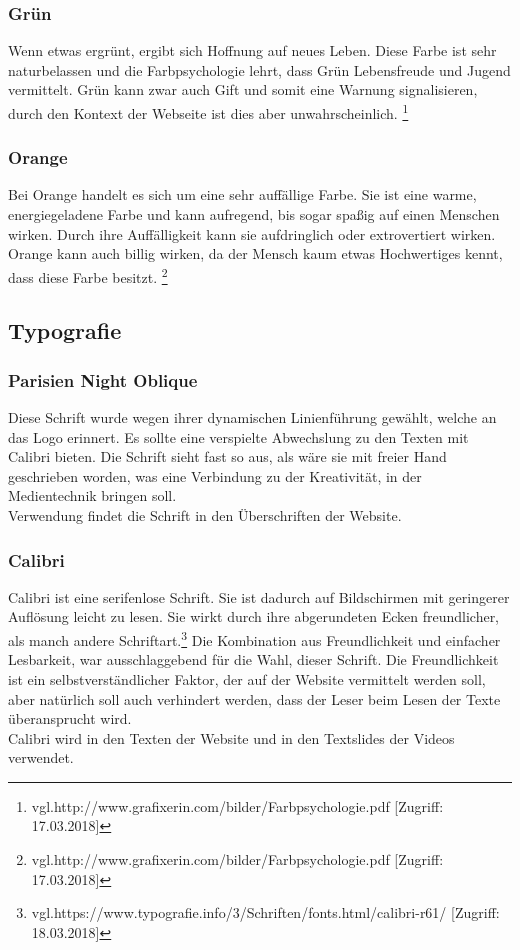 \subsubsection{Grün}
Wenn etwas ergrünt, ergibt sich Hoffnung auf neues Leben. Diese Farbe ist sehr naturbelassen und die Farbpsychologie lehrt, dass Grün Lebensfreude und Jugend vermittelt. Grün kann zwar auch Gift und somit eine Warnung signalisieren, durch den Kontext der Webseite ist dies aber unwahrscheinlich. \footnote{\label{} vgl.http://www.grafixerin.com/bilder/Farbpsychologie.pdf [Zugriff: 17.03.2018]}

\subsubsection{Orange}
Bei Orange handelt es sich um eine sehr auffällige Farbe. Sie ist eine warme, energiegeladene Farbe und kann aufregend, bis sogar spaßig auf einen Menschen wirken. Durch ihre Auffälligkeit kann sie aufdringlich oder extrovertiert wirken. Orange kann auch billig wirken, da der Mensch kaum etwas Hochwertiges kennt, dass diese Farbe besitzt. \footnote{\label{} vgl.http://www.grafixerin.com/bilder/Farbpsychologie.pdf [Zugriff: 17.03.2018]}

\subsection{Typografie}
\subsubsection{Parisien Night Oblique}
Diese Schrift wurde wegen ihrer dynamischen Linienführung gewählt, welche an das Logo erinnert. Es sollte eine verspielte Abwechslung zu den Texten mit Calibri bieten. Die Schrift sieht fast so aus, als wäre sie mit freier Hand geschrieben worden, was eine Verbindung zu der Kreativität, in der Medientechnik bringen soll.
\\
Verwendung findet die Schrift in den Überschriften der Website.

\subsubsection{Calibri}
Calibri ist eine serifenlose Schrift. Sie ist dadurch auf Bildschirmen mit geringerer Auflösung leicht zu lesen. Sie wirkt durch ihre abgerundeten Ecken freundlicher, als manch andere Schriftart.\footnote{\label{} vgl.https://www.typografie.info/3/Schriften/fonts.html/calibri-r61/ [Zugriff: 18.03.2018]} Die Kombination aus Freundlichkeit und einfacher Lesbarkeit, war ausschlaggebend für die Wahl, dieser Schrift. Die Freundlichkeit ist ein selbstverständlicher Faktor, der auf der Website vermittelt werden soll, aber natürlich soll auch verhindert werden, dass der Leser beim Lesen der Texte überansprucht wird.
\\
Calibri wird in den Texten der Website und in den Textslides der Videos verwendet.

